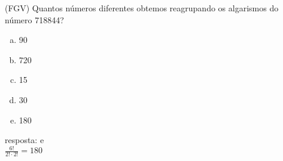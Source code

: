 \begin{ex}
 	(FGV) Quantos números diferentes obtemos reagrupando os algarismos do número 718844?
    \begin{enumerate}[(a)]
    \item 90
    \item 720
    \item 15
    \item 30
    \item 180
    \end{enumerate}
      \begin{sol}
        resposta: e \\
        $\frac{6!}{2!\cdot2!}=180$
      \end{sol}
\end{ex}